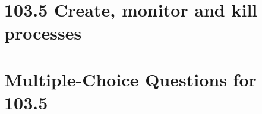 \documentclass[a4paper]{report}
\begin{document}

\newpage
\section*{103.5 Create, monitor and kill processes}

\newpage
\section*{Multiple-Choice Questions for 103.5}
\end{document}
